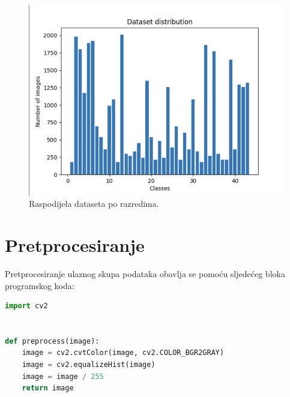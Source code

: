 \documentclass[times, utf8, zavrsni]{fer}
\begin{document}
\begin{figure}[h!]
  \includegraphics[width=\linewidth,trim=4 4 4 4,clip]{images/distribution.jpeg}
  \caption{Raspodijela dataseta po razredima.}
\end{figure}
\pagebreak
\section{Pretprocesiranje}
Pretprocesiranje ulaznog skupa podataka obavlja se pomoću sljedećeg bloka programskog koda:
\begin{lstlisting}[language=Python]
import cv2


def preprocess(image):
    image = cv2.cvtColor(image, cv2.COLOR_BGR2GRAY)
    image = cv2.equalizeHist(image)
    image = image / 255
    return image
\end{lstlisting}
\end{document}
